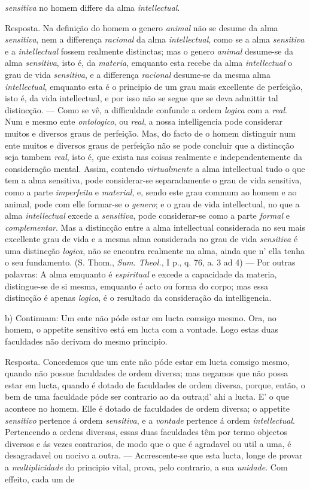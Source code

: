 \emph{sensitiva} no homem differe da alma \emph{intellectual}.\par Resposta. Na definição do homem o genero \emph{animal} não se desume da alma \emph{sensitiva}, nem a differença \emph{racional} da alma \emph{intellectual}, como se a alma \emph{sensitiva} e a \emph{intellectual} fossem realmente distinctas; mas o genero \emph{animal} desume-se da alma \emph{sensitiva}, isto é, da \emph{materia}, emquanto esta recebe da alma \emph{intellectual} o grau de vida \emph{sensitiva}, e a differença \emph{racional} desume-se da mesma alma \emph{intellectual}, emquanto esta é o principio de um grau mais excellente de perfeição, isto é, da vida intellectual, e por isso não se segue que se deva admittir tal distincção. --- Como se vê, a difficuldade confunde a ordem \emph{logica} com a \emph{real}. Num e mesmo ente \emph{ontologico}, ou \emph{real}, a nossa intelligencia pode considerar muitos e diversos graus de perfeição. Mas, do facto de o homem distinguir num ente muitos e diversos graus de perfeição não se pode concluir que a distincção seja tambem \emph{real}, isto é, que exista nas coisas realmente e independentemente da consideração mental. Assim, contendo \emph{virtualmente} a alma intellectual tudo o que tem a alma sensitiva, pode considerar-se separadamente o grau de vida sensitiva, como a parte \emph{imperfeita} e \emph{material}, e, sendo este grau commum ao homem e ao animal, pode com elle formar-se o \emph{genero}; e o grau de vida intellectual, no que a alma \emph{intellectual} excede a \emph{sensitiva}, pode considerar-se como a parte \emph{formal} e \emph{complementar}. Mas a distincção entre a alma intellectual considerada no seu mais excellente grau de vida e a mesma alma considerada no grau de vida \emph{sensitiva} é uma distincção \emph{logica}, não se encontra realmente na alma, ainda que n' ella tenha o seu fundamento. (S. Thom., \emph{Sum. Theol.}, I p., q. 76, a. 3 ad 4) --- Por outras palavras: A alma emquanto é \emph{espiritual} e excede a capacidade da materia, distingue-se de si mesma, emquanto é acto ou forma do corpo; mas essa distincção é apenas \emph{logica}, é o resultado da consideração da intelligencia.\par b) Continuam: Um ente não póde estar em lucta comsigo mesmo. Ora, no homem, o appetite sensitivo está em lucta com a vontade. Logo estas duas faculdades não derivam do mesmo principio.\par Resposta. Concedemos que um ente não póde estar em lucta comsigo mesmo, quando não possue faculdades de ordem diversa; mas negamos que não possa estar em lucta, quando é dotado de faculdades de ordem diversa, porque, então, o bem de uma faculdade póde ser contrario ao da outra;d' ahi a lucta. E' o que acontece no homem. Elle é dotado de faculdades de ordem diversa; o appetite \emph{sensitivo} pertence á ordem \emph{sensitiva}, e a \emph{vontade} pertence á ordem \emph{intellectual}. Pertencendo a ordens diversas, essas duas faculdades têm por termo objectos diversos e ás vezes contrarios, de modo que o que é agradavel ou util a uma, é desagradavel ou nocivo a outra. --- Accrescente-se que esta lucta, longe de provar a \emph{multiplicidade} do principio vital, prova, pelo contrario, a sua \emph{unidade}. Com effeito, cada um de 